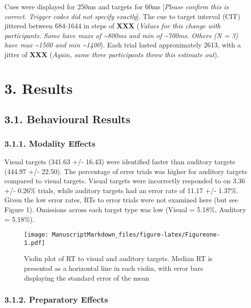\documentclass[
  english,
  ,man,floatsintext]{apa6}
\begin{document}
Cues were displayed for 250ms and targets for 60ms {[}\emph{Please confirm this is correct. Trigger codes did not specify exactly}{]}. The cue to target interval (CIT) jittered between 684-1644 in steps of \textbf{XXX} (\emph{Values for this change with participants. Some have maxs of \textasciitilde{}800ms and min of \textasciitilde{}700ms. Others (N = 3) have max \textasciitilde{}1500 and min \textasciitilde{}1400}). Each trial lasted approximately 2613, with a jitter of \textbf{XXX} (\emph{Again, same three participants throw this estimate out}).

\hypertarget{results}{%
\section{3. Results}\label{results}}

\hypertarget{behavioural-results}{%
\subsection{3.1. Behavioural Results}\label{behavioural-results}}

\hypertarget{modality-effects}{%
\subsubsection{3.1.1. Modality Effects}\label{modality-effects}}

Visual targets (341.63 +/- 16.43) were identified faster than auditory targets (444.97 +/- 22.50). The percentage of errer trials was higher for auditory targets compared to visual targets. Visual targets were incorrectly responded to on 3.36 +/- 0.26\% trials, while auditory targets had an error rate of 11.17 +/- 1.37\%. Given the low error rates, RTs to error trials were not examined here (but see Figure 1). Omissions across each target type was low (Visual = 5.18\%, Auditory = 5.18\%).

\begin{figure}
\centering
\texttt{[image: ManuscriptMarkdown\_files/figure-latex/Figureone-1.pdf]}
\caption{\label{fig:Figureone}Violin plot of RT to visual and auditory targets. Median RT is presented as a horizontal line in each violin, with error bars displaying the standard error of the mean}
\end{figure}

\hypertarget{preparatory-effects}{%
\subsubsection{3.1.2. Preparatory Effects}\label{preparatory-effects}}
\end{document}

